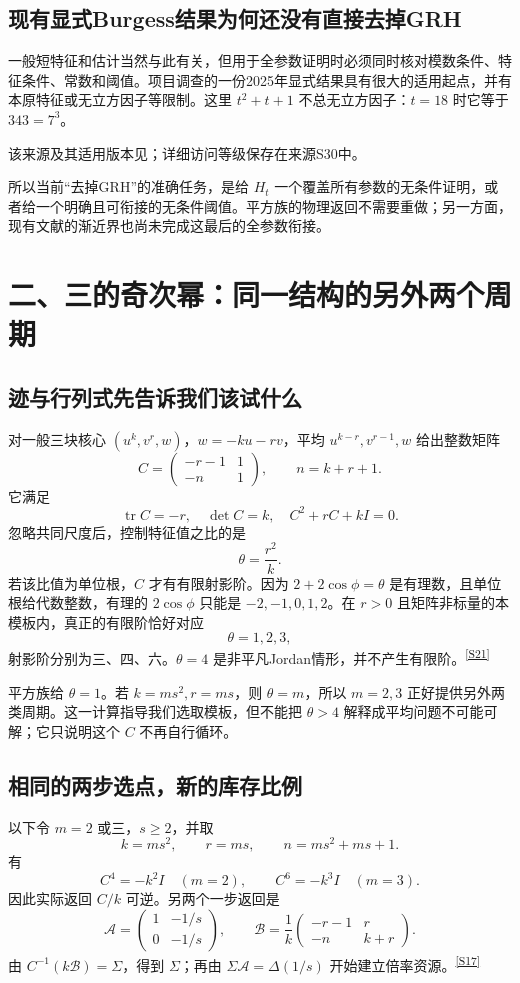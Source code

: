 \documentclass[11pt,a4paper,oneside,openany]{book}
\newcommand{\src}[1]{\textsuperscript{\hyperref[source:#1]{[#1]}}}
\theoremstyle{definition}\newtheorem{example}[theorem]{例}\newtheorem{conjecture}[theorem]{猜想}
\numberwithin{equation}{chapter}\setcounter{tocdepth}{1}
\begin{document}
\section{现有显式Burgess结果为何还没有直接去掉GRH}
一般短特征和估计当然与此有关，但用于全参数证明时必须同时核对模数条件、特征条件、常数和阈值。项目调查的一份2025年显式结果具有很大的适用起点，并有本原特征或无立方因子等限制。这里 $t^2+t+1$ 不总无立方因子：$t=18$ 时它等于 $343=7^3$。

该来源及其适用版本见\cite{ExplicitBurgess2025}；详细访问等级保存在来源S30中。

所以当前“去掉GRH”的准确任务，是给 $H_t$ 一个覆盖所有参数的无条件证明，或者给一个明确且可衔接的无条件阈值。平方族的物理返回不需要重做；另一方面，现有文献的渐近界也尚未完成这最后的全参数衔接。


\chapter{二、三的奇次幂：同一结构的另外两个周期}\label{ch:twothree}
\section{迹与行列式先告诉我们该试什么}
对一般三块核心 $(u^k,v^r,w)$，$w=-ku-rv$，平均 $u^{k-r},v^{r-1},w$ 给出整数矩阵
\[C=\begin{pmatrix}-r-1&1\\-n&1\end{pmatrix},
\qquad n=k+r+1.
\]
它满足
\[\operatorname{tr}C=-r,\quad\det C=k,\quad C^2+rC+kI=0.
\]
忽略共同尺度后，控制特征值之比的是
\[\theta=\frac{r^2}{k}.
\]
若该比值为单位根，$C$ 才有有限射影阶。因为 $2+2\cos\phi=\theta$ 是有理数，且单位根给代数整数，有理的 $2\cos\phi$ 只能是 $-2,-1,0,1,2$。在 $r>0$ 且矩阵非标量的本模板内，真正的有限阶恰好对应
\[\theta=1,2,3,
\]
射影阶分别为三、四、六。$\theta=4$ 是非平凡Jordan情形，并不产生有限阶。\src{S21}

平方族给 $\theta=1$。若 $k=ms^2,r=ms$，则 $\theta=m$，所以 $m=2,3$ 正好提供另外两类周期。这一计算指导我们选取模板，但不能把 $\theta>4$ 解释成平均问题不可能可解；它只说明这个 $C$ 不再自行循环。

\section{相同的两步选点，新的库存比例}
以下令 $m=2$ 或三，$s\ge2$，并取
\[k=ms^2,\qquad r=ms,\qquad n=ms^2+ms+1.
\]
有
\[C^4=-k^2I\quad(m=2),\qquad C^6=-k^3I\quad(m=3).
\]
因此实际返回 $C/k$ 可逆。另两个一步返回是
\[
\mathcal A=\begin{pmatrix}1&-1/s\\0&-1/s\end{pmatrix},\qquad
\mathcal B=\frac1k\begin{pmatrix}-r-1&r\\-n&k+r\end{pmatrix}.
\]
由 $C^{-1}(k\mathcal B)=\Sigma$，得到 $\Sigma$；再由 $\Sigma\mathcal A=\Delta(1/s)$ 开始建立倍率资源。\src{S17}
\end{document}
